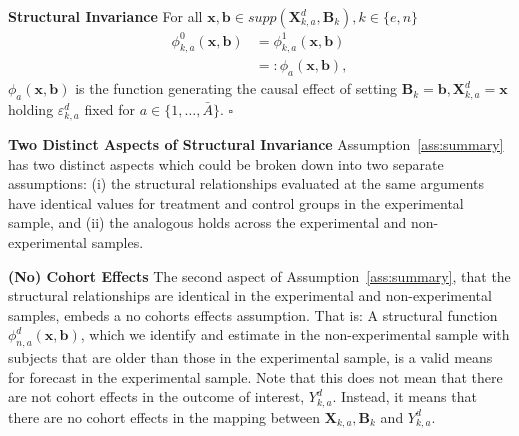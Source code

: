 \onehalfspacing
\begin{assumption} \label{ass:summary} \textbf{Structural Invariance}
For all $\bm{x}, \bm{b} \in supp(\bm{X}^d_{k,a}, \bm{B}_k), k \in \{e,n\}$
\begin{align}
\phi_{k,a}^0 \left( \bm{x}, \bm{b} \right) &= \phi_{k,a}^1 (\bm{x}, \bm{b}) \\   \nonumber                                                                     &=: \phi_{a} (\bm{x}, \bm{b}),
\end{align}
$\phi_{a}(\bm{x}, \bm{b})$ is the function generating the causal effect of setting $ \bm{B}_k=\bm{b}, \bm{X}^d_{k,a}=\bm{x}$ holding $\varepsilon^d_{k,a}$ fixed for $a \in \{1,\dots,\bar{A}\}$. $\square$
\end{assumption}

\begin{remark} \textbf{Two Distinct Aspects of Structural Invariance}
Assumption~\ref{ass:summary} has two distinct aspects which could be broken down into two separate assumptions: (i) the structural relationships evaluated at the same arguments have identical values for treatment and control groups in the experimental sample, and (ii) the analogous holds across the experimental and non-experimental samples. 
\end{remark}

\begin{remark} \label{remark:cohort} \textbf{(No) Cohort Effects}
The second aspect of Assumption~\ref{ass:summary}, that the structural relationships are identical in the experimental and non-experimental samples, embeds a no cohorts effects assumption. That is: A structural function $\phi_{n,a}^d \left( \bm{x}, \bm{b} \right)$, which we identify and estimate in the non-experimental sample with subjects that are older than those in the experimental sample, is a valid means for forecast in the experimental sample. Note that this does not mean that there are not cohort effects in the outcome of interest, $Y_{k,a}^d$. Instead, it means that there are no cohort effects in the mapping between $\bm{X}_{k,a}, \bm{B}_k$ and $Y_{k,a}^d$. 
\end{remark}
\doublespacing

